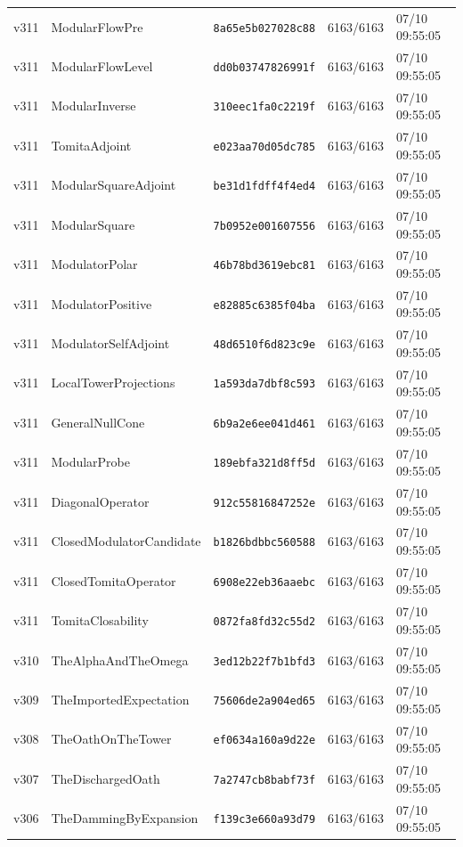 \documentclass[11pt]{article}
\theoremstyle{definition}\newtheorem{deriv}{Derivação}
\begin{document}
{\begin{longtable}{@{}lllll@{}}
v311 & ModularFlowPre & \texttt{8a65e5b027028c88} & 6163/6163 & 07/10 09:55:05 \\
v311 & ModularFlowLevel & \texttt{dd0b03747826991f} & 6163/6163 & 07/10 09:55:05 \\
v311 & ModularInverse & \texttt{310eec1fa0c2219f} & 6163/6163 & 07/10 09:55:05 \\
v311 & TomitaAdjoint & \texttt{e023aa70d05dc785} & 6163/6163 & 07/10 09:55:05 \\
v311 & ModularSquareAdjoint & \texttt{be31d1fdff4f4ed4} & 6163/6163 & 07/10 09:55:05 \\
v311 & ModularSquare & \texttt{7b0952e001607556} & 6163/6163 & 07/10 09:55:05 \\
v311 & ModulatorPolar & \texttt{46b78bd3619ebc81} & 6163/6163 & 07/10 09:55:05 \\
v311 & ModulatorPositive & \texttt{e82885c6385f04ba} & 6163/6163 & 07/10 09:55:05 \\
v311 & ModulatorSelfAdjoint & \texttt{48d6510f6d823c9e} & 6163/6163 & 07/10 09:55:05 \\
v311 & LocalTowerProjections & \texttt{1a593da7dbf8c593} & 6163/6163 & 07/10 09:55:05 \\
v311 & GeneralNullCone & \texttt{6b9a2e6ee041d461} & 6163/6163 & 07/10 09:55:05 \\
v311 & ModularProbe & \texttt{189ebfa321d8ff5d} & 6163/6163 & 07/10 09:55:05 \\
v311 & DiagonalOperator & \texttt{912c55816847252e} & 6163/6163 & 07/10 09:55:05 \\
v311 & ClosedModulatorCandidate & \texttt{b1826bdbbc560588} & 6163/6163 & 07/10 09:55:05 \\
v311 & ClosedTomitaOperator & \texttt{6908e22eb36aaebc} & 6163/6163 & 07/10 09:55:05 \\
v311 & TomitaClosability & \texttt{0872fa8fd32c55d2} & 6163/6163 & 07/10 09:55:05 \\
v310 & TheAlphaAndTheOmega & \texttt{3ed12b22f7b1bfd3} & 6163/6163 & 07/10 09:55:05 \\
v309 & TheImportedExpectation & \texttt{75606de2a904ed65} & 6163/6163 & 07/10 09:55:05 \\
v308 & TheOathOnTheTower & \texttt{ef0634a160a9d22e} & 6163/6163 & 07/10 09:55:05 \\
v307 & TheDischargedOath & \texttt{7a2747cb8babf73f} & 6163/6163 & 07/10 09:55:05 \\
v306 & TheDammingByExpansion & \texttt{f139c3e660a93d79} & 6163/6163 & 07/10 09:55:05 \\

\end{longtable}}
\end{document}

